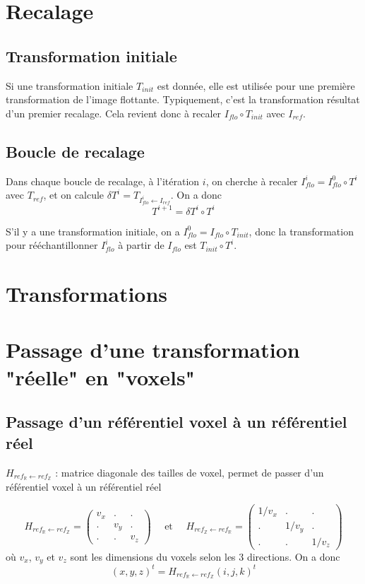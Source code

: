 \documentclass[10pt]{report}
\newcommand{\ens}[4]{ {#1}_{\mathbb{#2}} \leftarrow {#3}_{\mathbb{#4}} }
\begin{document}
\section{Recalage}

\subsection{Transformation initiale}

Si une transformation initiale $T_{init}$ est donn\'ee, elle est utilis\'ee pour une premi\`ere transformation de l'image flottante. Typiquement, c'est la transformation r\'esultat d'un premier recalage.
Cela revient donc \`a recaler $I_{flo} \circ T_{init}$ avec $I_{ref}$.

\subsection{Boucle de recalage}

Dans chaque boucle de recalage, \`a l'it\'eration $i$, on cherche \`a recaler $I_{flo}^i = I_{flo}^0 \circ T^i $ avec $T_{ref}$, et on calcule ${\delta}T^i = T_{I_{flo}^i \leftarrow I_{ref}}$.
On a donc 
$$
T^{i+1} = {\delta}T^i \circ T^i
$$

S'il y a une transformation initiale, on a $I_{flo}^0 = I_{flo} \circ T_{init}$, donc la transformation pour r\'e\'echantillonner $I_{flo}^i$ \`a partir de $I_{flo}$ est $T_{init} \circ T^i$.




\section{Transformations}

\section{Passage d'une transformation "r\'eelle" en "voxels"}

\subsection{Passage d'un r\'ef\'erentiel voxel \`a un r\'ef\'erentiel r\'eel}

$H_{\ens{ref}{R}{ref}{Z}}$ : matrice diagonale des tailles de voxel, permet de passer d'un r\'ef\'erentiel voxel \`a un r\'ef\'erentiel r\'eel

$$H_{\ens{ref}{R}{ref}{Z}} = \left( \begin{array}{ccc}
v_x & . & . \\
. & v_y & .\\
. & . & v_z
\end{array} \right)
\quad \mbox{ et } \quad
H_{\ens{ref}{Z}{ref}{R}} = \left( \begin{array}{ccc}
1/v_x & . & . \\
. & 1/v_y & .\\
. & . & 1/v_z
\end{array} \right)
$$
o\`u $v_x$, $v_y$ et $v_z$ sont les dimensions du voxels selon les 3 directions.
On a donc 
$$
(x,y,z)^t = H_{\ens{ref}{R}{ref}{Z}} (i,j,k)^t
$$
\end{document}
